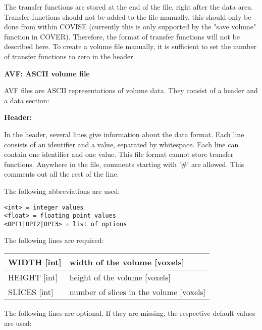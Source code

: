The transfer functions are stored at the end of the file, right after the data area.
Transfer functions should not be added to the file manually, this should only be done from within COVISE (currently this
is only supported by the "save volume" function in COVER). Therefore, the format of 
transfer functions will not be described here. To create a volume file manually, it is 
sufficient to set the number of transfer functions to zero in the header.

{\bf AVF: ASCII volume file}

AVF files are ASCII representations of volume data. They consist of a header and a data section:

{\bf Header:} 

In the header, several lines give information about the data format. Each line consists of an 
identifier and a value, separated by whitespace.
Each line can contain one identifier and one value. This file format cannot store transfer functions. 
Anywhere in the file, comments starting with '\#' are allowed. This comments out all the rest of the line.

The following abbreviations are used: 
\begin{verbatim}
<int> = integer values
<float> = floating point values
<OPT1|OPT2|OPT3> = list of options
\end{verbatim}

The following lines are required:

\begin{longtable}{|l|l|}
\hline
  WIDTH [int] & width of the volume [voxels]  \\
\hline
  HEIGHT [int] & height of the volume [voxels]  \\ 
\hline
  SLICES [int] &  number of slices in the volume [voxels]  \\
\hline
\end{longtable} 

The following lines are optional. If they are missing, the respective default values are used:

